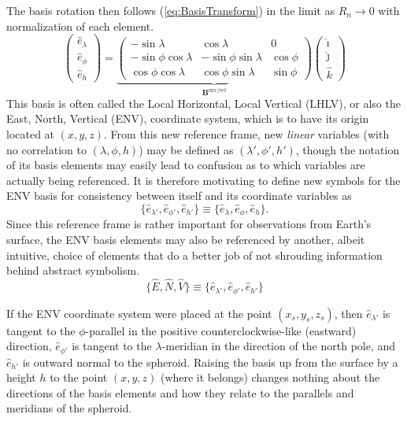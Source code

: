 \documentclass[11pt,dvipsnames]{thesis}
\begin{document}
The basis rotation then follows (\ref{eq:BasisTransform}) in the limit as $R_n \to 0$ with normalization of each element.
\begin{equation}
\begin{pmatrix}\hat{e}_\lambda \\ \hat{e}_\phi \\ \hat{e}_h\end{pmatrix} = \underbrace{\begin{pmatrix}-\sin\lambda & \cos\lambda & 0 \\ -\sin\phi\cos\lambda & -\sin\phi\sin\lambda & \cos\phi \\ \cos\phi\cos\lambda & \cos\phi\sin\lambda & \sin\phi\end{pmatrix}}_{\mathbf{B}^{\text{env}/\text{ecf}}} \begin{pmatrix}\hat{\imath} \\ \hat{\jmath} \\ \hat{k}\end{pmatrix}
\end{equation}
This basis is often called the Local Horizontal, Local Vertical (LHLV), or also the East, North, Vertical (ENV), coordinate system, which is to have its origin located %
at $(x, y, z)$.
From this new reference frame, new \textit{linear} variables (with no correlation to $(\lambda, \phi, h)$) may be defined as $(\lambda', \phi', h')$, though the notation of its basis elements may easily lead to confusion as to which variables are actually being referenced. It is therefore motivating to define new symbols for the ENV basis for consistency between itself and its coordinate variables as
\begin{equation}
\{\hat{e}_{\lambda'}, \hat{e}_{\phi'}, \hat{e}_{h'}\} \equiv \{\hat{e}_\lambda, \hat{e}_\phi, \hat{e}_h\}.
\end{equation}
Since this reference frame is rather important for observations from Earth's surface, the ENV basis elements may also be referenced by another, albeit intuitive, choice of elements that do a better job of not shrouding information behind abstract symbolism.
\begin{equation}
\{\widehat{E}, \widehat{N}, \widehat{V}\} \equiv \{\hat{e}_{\lambda'}, \hat{e}_{\phi'}, \hat{e}_{h'}\}
\end{equation}

If the ENV coordinate system were placed at the point $(x_s, y_s, z_s)$, then $\hat{e}_{\lambda'}$ is tangent to the $\phi$-parallel in the positive counterclockwise-like (eastward) direction, $\hat{e}_{\phi'}$ is tangent to the $\lambda$-meridian in the direction of the north pole, and $\hat{e}_{h'}$ is outward normal to the spheroid. Raising the basis up from the surface by a height $h$ to the point $(x, y, z)$ (where it belongs) changes nothing about the directions of the basis elements and how they relate to the parallels and meridians of the spheroid. 
\end{document}
